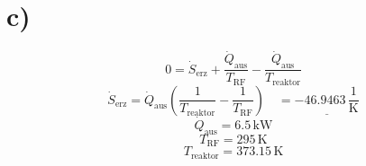 

\section*{c)}
\[
0 = \dot{S}_{\text{erz}} + \frac{\dot{Q}_{\text{aus}}}{T_{\text{RF}}} - \frac{\dot{Q}_{\text{aus}}}{T_{\text{reaktor}}}
\]
\[
\dot{S}_{\text{erz}} = \dot{Q}_{\text{aus}} \left( \frac{1}{T_{\text{reaktor}}} - \frac{1}{T_{\text{RF}}} \right) \quad = \underline{-46.9463 \, \frac{1}{\text{K}}}
\]
\[
\dot{Q}_{\text{aus}} = 6.5 \, \text{kW}
\]
\[
T_{\text{RF}} = 295 \, \text{K}
\]
\[
T_{\text{reaktor}} = 373.15 \, \text{K}
\]